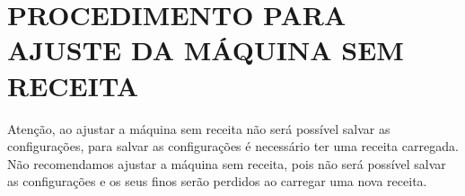 \thispagestyle{fancy}

\vspace*{40 pt}

\section{\large{PROCEDIMENTO PARA AJUSTE DA MÁQUINA SEM RECEITA}}

Atenção, ao ajustar a máquina sem receita não será possível salvar as configurações, para salvar as configurações é necessário ter uma receita carregada.
Não recomendamos ajustar a máquina sem receita, pois não será possível salvar as configurações e os seus finos serão perdidos ao carregar uma nova receita.


